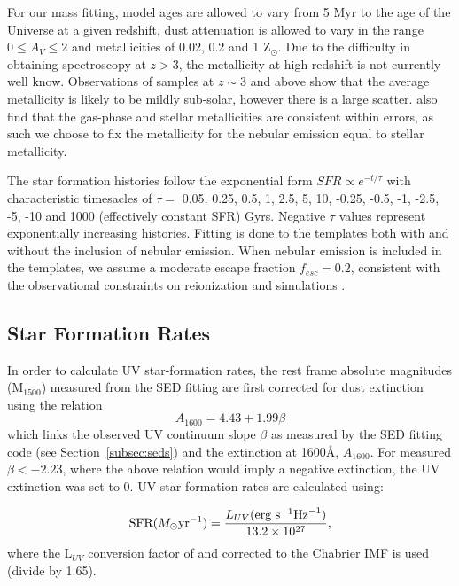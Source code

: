 For our mass fitting, model ages are allowed to vary from 5 Myr to the age of the Universe at a given redshift, dust attenuation is allowed to vary in the range $0 \le A_{V} \le 2$ and metallicities of 0.02, 0.2 and 1 Z$_{\odot}$. Due to the difficulty in obtaining spectroscopy at $z > 3$, the metallicity at high-redshift is not currently well know. Observations of samples at $z \sim 3$ and above \citep{Shapley:2003wi,2008ASPC..396..409M,2012A&A...539A.136S,Jones:2012kn} show that the average metallicity is likely to be mildly sub-solar, however there is a large scatter. \citet{2012A&A...539A.136S} also find that the gas-phase and stellar metallicities are consistent within errors, as such we choose to fix the metallicity for the nebular emission equal to stellar metallicity.

The star formation histories follow the exponential form $SFR \propto e^{-t/\tau}$ with characteristic timesacles of $\tau = $ 0.05, 0.25, 0.5, 1, 2.5, 5, 10, -0.25, -0.5, -1, -2.5, -5, -10 and 1000 (effectively constant SFR) Gyrs. Negative $\tau$ values represent exponentially increasing histories. Fitting is done to the templates both with and without the inclusion of nebular emission. When nebular emission is included in the templates, we assume a moderate escape fraction $f_{esc} = 0.2$, consistent with the observational constraints on reionization and simulations \citep{Fernandez:2011cw,Yajima:2010fb,Finkelstein:2012hr,Robertson:2013ji}.

\subsection{Star Formation Rates}
In order to calculate UV star-formation rates, the rest frame absolute magnitudes (M$_{1500}$) measured from the SED fitting are first corrected for dust extinction using the \citet{Meurer:1999jm} relation
\begin{equation}
A_{1600} = 4.43 + 1.99\beta
\end{equation}
which links the observed UV continuum slope $\beta$ as measured by the SED fitting code (see Section~\ref{subsec:seds}) and the extinction at 1600\AA, $A_{1600}$. For measured $\beta < - 2.23$, where the above relation would imply a negative extinction, the UV extinction was set to 0. UV star-formation rates are calculated using: 

\begin{equation}\label{eq:sfr}
  \textup{SFR} (M_{\odot} \textup{yr}^{-1}) = 
    \frac{L_{UV} (\textup{erg s}^{-1} \textup{Hz}^{-1})} {13.2 \times 10^{27}} ,
\end{equation}
where the L$_{UV}$ conversion factor of \citet{Madau:1998jd} and \citet{KennicuttJr:1998id} corrected to the Chabrier IMF is used (divide by 1.65).

